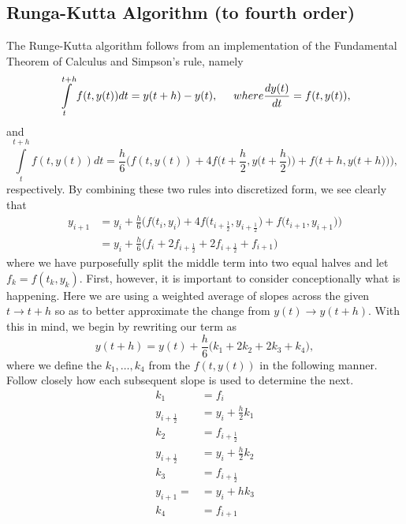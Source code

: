\documentclass[11pt,a4paper]{article}
\begin{document}
\subsection{Runga-Kutta Algorithm (to fourth order)}

The Runge-Kutta algorithm follows from an implementation of the Fundamental Theorem of Calculus and Simpson's rule, namely
\begin{equation}
\int\limits_t^{t+h} f(t,y(t))dt = y(t+h) - y(t), \hspace{0.5 cm} where \frac{dy(t)}{dt} = f(t,y(t)),
\end{equation}
and
\begin{equation}
\int\limits_t^{t+h} f(t,y(t))dt = \frac{h}{6}\bigg(f(t,y(t)) + 4f\Big(t+\frac{h}{2},y\big(t+\frac{h}{2}\big)\Big)+f\Big(t+h,y\big(t+h\big)\Big)\bigg),
\end{equation}
respectively. By combining these two rules into discretized form, we see clearly that
\begin{align}
y_{i+1} &= y_i + \frac{h}{6}\Big(f\big(t_i,y_i\big) + 4f\big(t_{i+\frac{1}{2}},y_{i+\frac{1}{2}}\big)+f\big(t_{i+1},y_{i+1}\big)\Big) \\
		&= y_i + \frac{h}{6}\Big(f_i + 2f_{i+\frac{1}{2}} + 2f_{i+\frac{1}{2}} + f_{i+1}\Big)
\end{align}
where we have purposefully split the middle term into two equal halves and let $f_k = f(t_k,y_k)$. First, however, it is important to consider conceptionally what is happening. Here we are using a weighted average of slopes across the given $t \rightarrow t+h$ so as to better approximate the change from $y(t) \rightarrow y(t+h)$. With this in mind, we begin by rewriting our term as
\begin{equation}
y(t+h) = y(t) + \frac{h}{6}\big(k_1 + 2k_2 + 2k_3 + k_4\big),
\end{equation}
where we define the $k_1, \dots, k_4$ from the $f(t,y(t))$ in the following manner. Follow closely how each subsequent slope is used to determine the next.
\begin{align}
k_1 &= f_i \\
y_{i+\frac{1}{2}} &= y_i + \frac{h}{2}k_1 \\
k_2 &= f_{i+\frac{1}{2}} \\
y_{i+\frac{1}{2}} &= y_i + \frac{h}{2}k_2 \\
k_3 &= f_{i+\frac{1}{2}} \\
y_{i+1} = &= y_i + hk_3 \\
k_4 &= f_{i+1}
\end{align}
\end{document}
